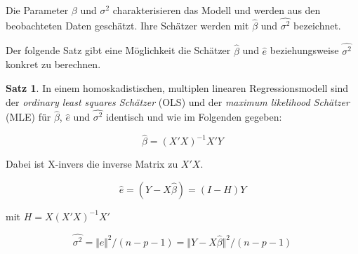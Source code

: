 \documentclass[12pt,a4paper]{article}
\theoremstyle{definition}
\theoremstyle{definition}
\newtheorem{Satz}[Definition]{Satz}
\theoremstyle{definition}
\theoremstyle{definition}
\begin{document}
Die Parameter $\beta$ und $\sigma^2$ charakterisieren das Modell und werden aus den beobachteten Daten geschätzt. Ihre Schätzer werden mit $\hat{\beta}$ und $\widehat{\sigma^2}$ bezeichnet.

Der folgende Satz gibt eine Möglichkeit die Schätzer $\hat{\beta}$ und $\hat{e}$ beziehungsweise $\widehat{\sigma^2}$ konkret zu berechnen.

\begin{Satz}
\label{erster Satz}
In einem homoskadistischen, multiplen linearen Regressionsmodell sind der \textit{ordinary least squares Schätzer} (OLS) und der \textit{maximum likelihood Schätzer} (MLE) für $\hat{\beta}$, $\hat{e}$ und $\widehat{\sigma^2}$ identisch und wie im Folgenden gegeben:

\begin{equation} \label{beta}
\hat{\beta} = (X'X)^{-1} X' Y
\end{equation}

Dabei ist \gls{X-invers} die inverse Matrix zu $X'X$.

\begin{equation} \label{e}
\hat{e} = (Y-X \hat{\beta}) = (I-H)Y
\end{equation}

mit $H=X(X'X)^{-1}X'$

\begin{equation} \label{sigma}
\widehat{\sigma^2} = \Vert \hat{e} \Vert^{2} / (n-p-1) = \Vert Y - X \hat{\beta} \Vert^{2} / (n-p-1)
\end{equation}

\end{Satz}
\end{document}
